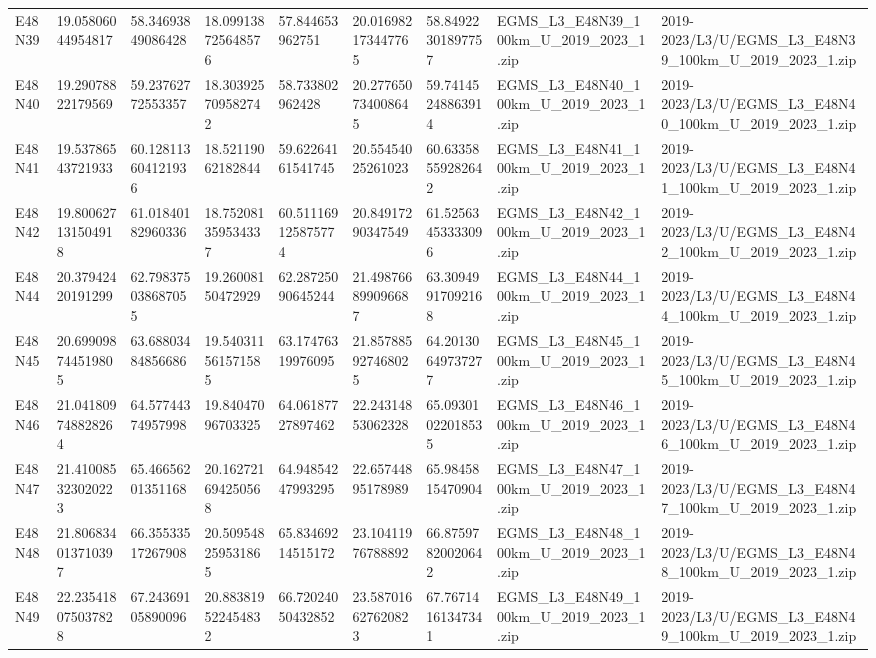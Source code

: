 \begin{landscape}
\begin{longtable}{lllllllll}
E48N39 & 19.05806044954817 & 58.34693849086428 & 18.099138725648576 & 57.844653962751 & 20.016982173447765 & 58.84922301897757 & EGMS\_L3\_E48N39\_100km\_U\_2019\_2023\_1.zip & 2019-2023/L3/U/EGMS\_L3\_E48N39\_100km\_U\_2019\_2023\_1.zip \\
E48N40 & 19.29078822179569 & 59.23762772553357 & 18.303925709582742 & 58.733802962428 & 20.277650734008645 & 59.74145248863914 & EGMS\_L3\_E48N40\_100km\_U\_2019\_2023\_1.zip & 2019-2023/L3/U/EGMS\_L3\_E48N40\_100km\_U\_2019\_2023\_1.zip \\
E48N41 & 19.53786543721933 & 60.128113604121936 & 18.52119062182844 & 59.62264161541745 & 20.55454025261023 & 60.63358559282642 & EGMS\_L3\_E48N41\_100km\_U\_2019\_2023\_1.zip & 2019-2023/L3/U/EGMS\_L3\_E48N41\_100km\_U\_2019\_2023\_1.zip \\
E48N42 & 19.800627131504918 & 61.01840182960336 & 18.752081359534337 & 60.511169125875774 & 20.84917290347549 & 61.52563453333096 & EGMS\_L3\_E48N42\_100km\_U\_2019\_2023\_1.zip & 2019-2023/L3/U/EGMS\_L3\_E48N42\_100km\_U\_2019\_2023\_1.zip \\
E48N44 & 20.37942420191299 & 62.798375038687055 & 19.26008150472929 & 62.28725090645244 & 21.498766899096687 & 63.30949917092168 & EGMS\_L3\_E48N44\_100km\_U\_2019\_2023\_1.zip & 2019-2023/L3/U/EGMS\_L3\_E48N44\_100km\_U\_2019\_2023\_1.zip \\
E48N45 & 20.699098744519805 & 63.68803484856686 & 19.540311561571585 & 63.17476319976095 & 21.857885927468025 & 64.20130649737277 & EGMS\_L3\_E48N45\_100km\_U\_2019\_2023\_1.zip & 2019-2023/L3/U/EGMS\_L3\_E48N45\_100km\_U\_2019\_2023\_1.zip \\
E48N46 & 21.041809748828264 & 64.57744374957998 & 19.84047096703325 & 64.06187727897462 & 22.24314853062328 & 65.09301022018535 & EGMS\_L3\_E48N46\_100km\_U\_2019\_2023\_1.zip & 2019-2023/L3/U/EGMS\_L3\_E48N46\_100km\_U\_2019\_2023\_1.zip \\
E48N47 & 21.410085323020223 & 65.46656201351168 & 20.162721694250568 & 64.94854247993295 & 22.65744895178989 & 65.9845815470904 & EGMS\_L3\_E48N47\_100km\_U\_2019\_2023\_1.zip & 2019-2023/L3/U/EGMS\_L3\_E48N47\_100km\_U\_2019\_2023\_1.zip \\
E48N48 & 21.806834013710397 & 66.35533517267908 & 20.509548259531865 & 65.83469214515172 & 23.10411976788892 & 66.87597820020642 & EGMS\_L3\_E48N48\_100km\_U\_2019\_2023\_1.zip & 2019-2023/L3/U/EGMS\_L3\_E48N48\_100km\_U\_2019\_2023\_1.zip \\
E48N49 & 22.235418075037828 & 67.24369105890096 & 20.883819522454832 & 66.72024050432852 & 23.587016627620823 & 67.76714161347341 & EGMS\_L3\_E48N49\_100km\_U\_2019\_2023\_1.zip & 2019-2023/L3/U/EGMS\_L3\_E48N49\_100km\_U\_2019\_2023\_1.zip \\

\end{longtable}
\end{landscape}
